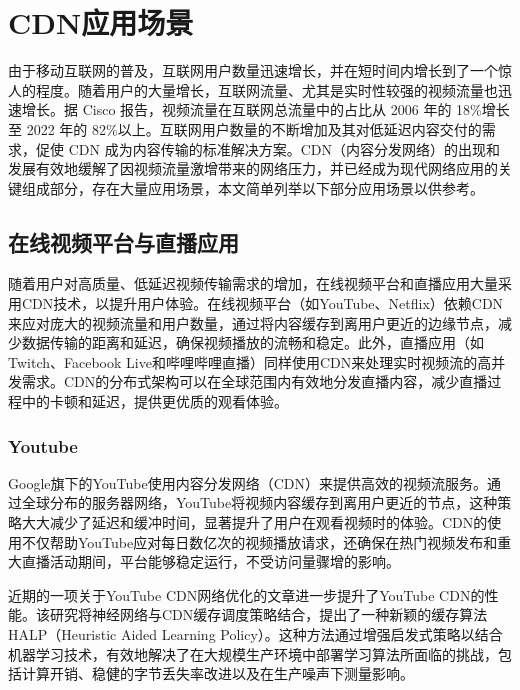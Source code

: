 \section{CDN应用场景}

由于移动互联网的普及，互联网用户数量迅速增长，并在短时间内增长到了一个惊人的程度。随着用户的大量增长，互联网流量、尤其是实时性较强的视频流量也迅速增长。据 Cisco 报告，视频流量在互联网总流量中的占比从 2006 年的 18\%增长至 2022 年的 82\%以上\cite{ghabashnehExploringInterplayCDN2020}。互联网用户数量的不断增加及其对低延迟内容交付的需求，促使 CDN 成为内容传输的标准解决方案\cite{zolfaghariContentDeliveryNetworks2020}。CDN（内容分发网络）的出现和发展有效地缓解了因视频流量激增带来的网络压力，并已经成为现代网络应用的关键组成部分，存在大量应用场景，本文简单列举以下部分应用场景以供参考。

\subsection{在线视频平台与直播应用}

随着用户对高质量、低延迟视频传输需求的增加，在线视频平台和直播应用大量采用CDN技术，以提升用户体验\cite{9155338}。在线视频平台（如YouTube、Netflix）依赖CDN来应对庞大的视频流量和用户数量，通过将内容缓存到离用户更近的边缘节点，减少数据传输的距离和延迟，确保视频播放的流畅和稳定。此外，直播应用\cite{9229196}（如Twitch、Facebook Live和哔哩哔哩直播）同样使用CDN来处理实时视频流的高并发需求。CDN的分布式架构可以在全球范围内有效地分发直播内容，减少直播过程中的卡顿和延迟，提供更优质的观看体验。

\subsubsection{Youtube}

Google旗下的YouTube使用内容分发网络（CDN）来提供高效的视频流服务\cite{song2023halp}。通过全球分布的服务器网络，YouTube将视频内容缓存到离用户更近的节点，这种策略大大减少了延迟和缓冲时间，显著提升了用户在观看视频时的体验。CDN的使用不仅帮助YouTube应对每日数亿次的视频播放请求，还确保在热门视频发布和重大直播活动期间，平台能够稳定运行，不受访问量骤增的影响\cite{song2023halp}\cite{Sun2024}。

近期的一项关于YouTube CDN网络优化的文章\cite{song2023halp}进一步提升了YouTube CDN的性能。该研究将神经网络与CDN缓存调度策略结合，提出了一种新颖的缓存算法HALP（Heuristic Aided Learning Policy）。这种方法通过增强启发式策略以结合机器学习技术，有效地解决了在大规模生产环境中部署学习算法所面临的挑战，包括计算开销、稳健的字节丢失率改进以及在生产噪声下测量影响。

